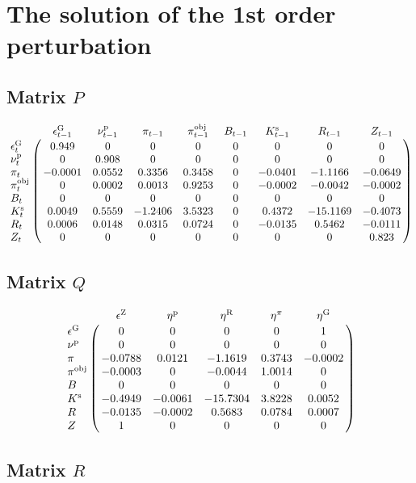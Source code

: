 \section{The solution of the 1st order perturbation}

\subsection*{Matrix $P$}

$$\bordermatrix{
~ & \epsilon^{\mathrm{G}}_{t-1} & \nu^{\mathrm{p}}_{t-1} & \pi_{t-1} & \pi^{\mathrm{obj}}_{t-1} & B_{t-1} & K^{\mathrm{s}}_{t-1} & R_{t-1} & Z_{t-1} \cr
\epsilon^{\mathrm{G}}_{t} & 0.949 & 0 & 0 & 0 & 0 & 0 & 0 & 0 \cr
\nu^{\mathrm{p}}_{t} & 0 & 0.908 & 0 & 0 & 0 & 0 & 0 & 0 \cr
\pi_{t} & -0.0001 & 0.0552 & 0.3356 & 0.3458 & 0 & -0.0401 & -1.1166 & -0.0649 \cr
\pi^{\mathrm{obj}}_{t} & 0 & 0.0002 & 0.0013 & 0.9253 & 0 & -0.0002 & -0.0042 & -0.0002 \cr
B_{t} & 0 & 0 & 0 & 0 & 0 & 0 & 0 & 0 \cr
K^{\mathrm{s}}_{t} & 0.0049 & 0.5559 & -1.2406 & 3.5323 & 0 & 0.4372 & -15.1169 & -0.4073 \cr
R_{t} & 0.0006 & 0.0148 & 0.0315 & 0.0724 & 0 & -0.0135 & 0.5462 & -0.0111 \cr
Z_{t} & 0 & 0 & 0 & 0 & 0 & 0 & 0 & 0.823 \cr
}$$

\subsection*{Matrix $Q$}

$$\bordermatrix{
~ & \epsilon^{\mathrm{Z}} & \eta^{\mathrm{p}} & \eta^{\mathrm{R}} & \eta^{\pi} & \eta^{\mathrm{G}} \cr
\epsilon^{\mathrm{G}} & 0 & 0 & 0 & 0 & 1 \cr
\nu^{\mathrm{p}} & 0 & 0 & 0 & 0 & 0 \cr
\pi & -0.0788 & 0.0121 & -1.1619 & 0.3743 & -0.0002 \cr
\pi^{\mathrm{obj}} & -0.0003 & 0 & -0.0044 & 1.0014 & 0 \cr
B & 0 & 0 & 0 & 0 & 0 \cr
K^{\mathrm{s}} & -0.4949 & -0.0061 & -15.7304 & 3.8228 & 0.0052 \cr
R & -0.0135 & -0.0002 & 0.5683 & 0.0784 & 0.0007 \cr
Z & 1 & 0 & 0 & 0 & 0 \cr
}$$

\subsection*{Matrix $R$}

